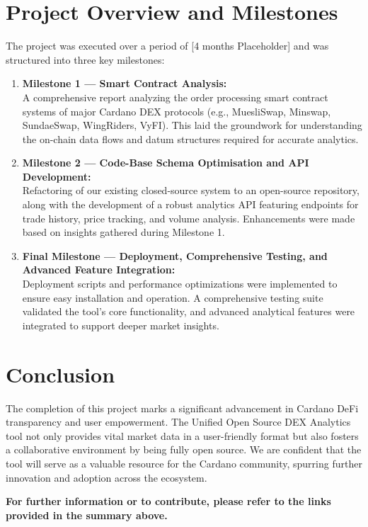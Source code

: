 \documentclass[11pt]{article}
\begin{document}
\section{Project Overview and Milestones}
The project was executed over a period of [4 months Placeholder] and was structured into three key milestones:
\begin{enumerate}
    \item \textbf{Milestone 1 --- Smart Contract Analysis:}\\
    A comprehensive report analyzing the order processing smart contract systems of major Cardano DEX protocols (e.g., MuesliSwap, Minswap, SundaeSwap, WingRiders, VyFI). This laid the groundwork for understanding the on-chain data flows and datum structures required for accurate analytics.
    
    \item \textbf{Milestone 2 --- Code-Base Schema Optimisation and API Development:}\\
    Refactoring of our existing closed-source system to an open-source repository, along with the development of a robust analytics API featuring endpoints for trade history, price tracking, and volume analysis. Enhancements were made based on insights gathered during Milestone 1.
    
    \item \textbf{Final Milestone --- Deployment, Comprehensive Testing, and Advanced Feature Integration:}\\
    Deployment scripts and performance optimizations were implemented to ensure easy installation and operation. A comprehensive testing suite validated the tool’s core functionality, and advanced analytical features were integrated to support deeper market insights.
\end{enumerate}

\section{Conclusion}
The completion of this project marks a significant advancement in Cardano DeFi transparency and user empowerment. The Unified Open Source DEX Analytics tool not only provides vital market data in a user-friendly format but also fosters a collaborative environment by being fully open source. We are confident that the tool will serve as a valuable resource for the Cardano community, spurring further innovation and adoption across the ecosystem.

\bigskip

\noindent \textbf{For further information or to contribute, please refer to the links provided in the summary above.}
\end{document}
